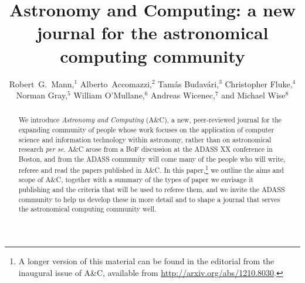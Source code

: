 
\resetcounters




\title{Astronomy and Computing: a new journal for the astronomical computing community}
\author{Robert~G.~Mann,$^1$ Alberto~Accomazzi,$^2$ Tam{\'a}s Budav{\'a}ri,$^3$ Christopher Fluke,$^4$ Norman Gray,$^5$ William O'Mullane,$^6$ Andreas Wicenec,$^7$ and Michael Wise$^8$\\
}


\begin{abstract}
We introduce {\em Astronomy and Computing\/} (A\&C), a new, peer-reviewed journal for the expanding community of people whose work focuses on the application of computer science and information technology within astronomy, rather than on astronomical research {\em per se\/}. A\&C arose from a BoF discussion at the ADASS XX conference in Boston, and from the ADASS community will come many of the people who will write, referee and read the papers published in A\&C. In this paper,\footnote{A longer version of this material can be found in the editorial from the inaugural issue of A\&C, available from \url{http://arxiv.org/abs/1210.8030}.} we outline the aims and scope of A\&C, together with a summary of the types of paper we envisage it publishing and the criteria that will be used to referee them, and we invite the ADASS community to help us develop these in more detail and to shape a journal that serves the astronomical computing community well.

\end{abstract}


